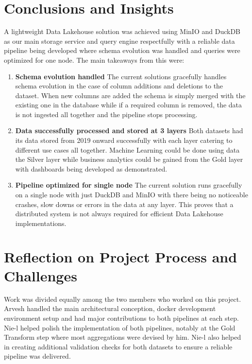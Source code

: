 \documentclass[conference]{IEEEtran}
\begin{document}
\section{Conclusions and Insights}
\label{sec:conclusion}

A lightweight Data Lakehouse solution was achieved using MinIO and DuckDB as our main storage service and query engine respectfully with a reliable data pipeline being developed where schema evolution was handled and queries were optimized for one node. The main takeaways from this were: 

\begin{enumerate}
    \item \textbf{Schema evolution handled} The current solutions gracefully handles schema evolution in the case of column additions and deletions to the dataset. When new columns are added the schema is simply merged with the existing one in the database while if a required column is removed, the data is not ingested all together and the pipeline stops processing.
    \item \textbf{Data successfully processed and stored at 3 layers} Both datasets had its data stored from 2019 onward successfully with each layer catering to different use cases all together. Machine Learning could be done using data the Silver layer while business analytics could be gained from the Gold layer with dashboards being developed as demonstrated.
    \item \textbf{Pipeline optimized for single node} The current solution runs gracefully on a single node with just DuckDB and MinIO with there being no noticeable crashes, slow downs or errors in the data at any layer. This proves that a distributed system is not always required for efficient Data Lakehouse implementations.
\end{enumerate}

\section{Reflection on Project Process and Challenges}
\label{sec:reflection}

Work was divided equally among the two members who worked on this project. Arvesh handled the main architectural conception, docker development environment setup and had major contributions to both pipelines at each step. Nie-l helped polish the implementation of both pipelines, notably at the Gold Transform step where most aggregations were devised by him. Nie-l also helped in creating additional validation checks for both datasets to ensure a reliable pipeline was delivered.
\end{document}
